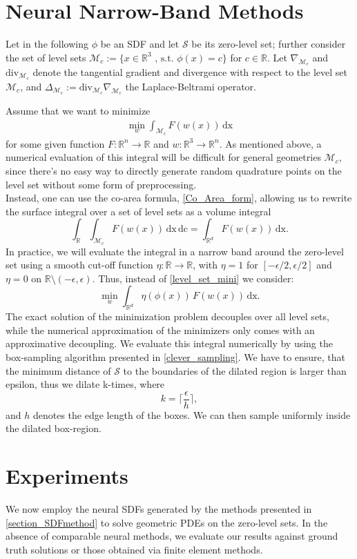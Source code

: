 \documentclass[12pt,openany]{book}
\newcommand{\R}{\mathbb{R}}
\def\S{\mathcal{S}}
\theoremstyle{plainnormal}
\theoremstyle{remark}
\begin{document}
\section{Neural Narrow-Band Methods}
Let in the following $\phi$ be an SDF and let $\S$ be its zero-level set; further consider the set of level sets $\mathcal{M}_c := \{x\in \R^3 \text{ , s.t. } \phi(x) = c\}$ for $c \in \R$. Let $\nabla_{\mathcal{M}_c}$ and $\mathrm{div}_{\mathcal{M}_c}$ denote the tangential gradient and divergence with respect to the level set $\mathcal M_c$, and $\Delta_{\mathcal M_c} := \mathrm{div}_{\mathcal{M}_c}\nabla_{\mathcal{M}_c} $ the Laplace-Beltrami operator.\par
Assume that we want to minimize \begin{align}\label{level_set_mini}
    \min_w\int_{\mathcal{M}_c} F(w(x)) \,\mathrm{dx}
\end{align} for some given function $F:\R^n \rightarrow\R$ and $w: \R^3 \rightarrow\R^n$. As mentioned above, a numerical evaluation of this integral will be difficult for general geometries $\mathcal M_c$, since there’s no easy way to directly generate random quadrature points on the level set without some form of preprocessing. \\
Instead, one can use the co-area formula, \cref{Co_Area_form}, allowing us to rewrite the surface integral over a set of level sets as a volume integral
$$\int_\R\int_{\mathcal{M}_c} F(w(x)) \,\mathrm{dx}\,\mathrm{dc}= \int_{\R^d}F(w(x)) \,\mathrm{dx}.$$
In practice, we will evaluate the integral in a narrow band around the zero-level set using a smooth cut-off function $\eta: \R\rightarrow\R$, with $\eta = 1$ for $[-\epsilon/2,\epsilon/2]$ and $\eta = 0$ on $\R \setminus(-\epsilon, \epsilon)$. Thus, instead of \cref{level_set_mini} we consider: 
$$\min_w \int_{\R^d} \eta(\phi(x))\,F(w(x))  \,\mathrm{dx}.$$
The exact solution of the minimization problem decouples over all level sets, while the numerical approximation of the minimizers only comes with an approximative decoupling.
We evaluate this integral numerically by using the box-sampling algorithm presented in \cref{clever_sampling}. We have to ensure, that the minimum distance of $\S$ to the boundaries of the dilated region is larger than epsilon, thus we dilate k-times, where $$k = \Big\lceil\frac{\epsilon}{h}\Big\rceil,$$
and $h$ denotes the edge length of the boxes. We can then sample uniformly inside the dilated box-region.
\section{Experiments}
We now employ the neural SDFs generated by the methods presented in \cref{section_SDFmethod} to solve geometric PDEs on the zero-level sets. In the absence of comparable neural methods, we evaluate our results against ground truth solutions or those obtained via finite element methods.
\end{document}
